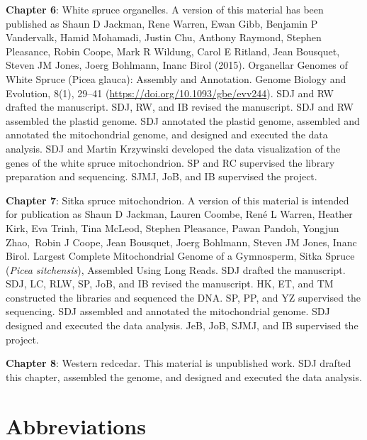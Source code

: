 \documentclass[
  12pt,
  oneside,
  openany]{book}
\begin{document}
\textbf{Chapter 6}: White spruce organelles. A version of this material has been published as Shaun D Jackman, Rene Warren, Ewan Gibb, Benjamin P Vandervalk, Hamid Mohamadi, Justin Chu, Anthony Raymond, Stephen Pleasance, Robin Coope, Mark R Wildung, Carol E Ritland, Jean Bousquet, Steven JM Jones, Joerg Bohlmann, Inanc Birol (2015). Organellar Genomes of White Spruce (Picea glauca): Assembly and Annotation. Genome Biology and Evolution, 8(1), 29--41 (\url{https://doi.org/10.1093/gbe/evv244}). SDJ and RW drafted the manuscript. SDJ, RW, and IB revised the manuscript. SDJ and RW assembled the plastid genome. SDJ annotated the plastid genome, assembled and annotated the mitochondrial genome, and designed and executed the data analysis. SDJ and Martin Krzywinski developed the data visualization of the genes of the white spruce mitochondrion. SP and RC supervised the library preparation and sequencing. SJMJ, JoB, and IB supervised the project.

\textbf{Chapter 7}: Sitka spruce mitochondrion. A version of this material is intended for publication as Shaun D Jackman, Lauren Coombe, René L Warren, Heather Kirk, Eva Trinh, Tina McLeod, Stephen Pleasance, Pawan Pandoh, Yongjun Zhao,~Robin J Coope, Jean Bousquet, Joerg Bohlmann, Steven JM Jones, Inanc Birol. Largest Complete Mitochondrial Genome of a Gymnosperm, Sitka Spruce (\emph{Picea sitchensis}), Assembled Using Long Reads. SDJ drafted the manuscript. SDJ, LC, RLW, SP, JoB, and IB revised the manuscript. HK, ET, and TM constructed the libraries and sequenced the DNA. SP, PP, and YZ supervised the sequencing. SDJ assembled and annotated the mitochondrial genome. SDJ designed and executed the data analysis. JeB, JoB, SJMJ, and IB supervised the project.

\textbf{Chapter 8}: Western redcedar. This material is unpublished work. SDJ drafted this chapter, assembled the genome, and designed and executed the data analysis.

\newpage

\tableofcontents

\newpage

\listoftables

\newpage

\listoffigures

\newpage

\markboth{}{}

\newpage

\hypertarget{abbreviations}{%
\section{Abbreviations}\label{abbreviations}}
\end{document}
